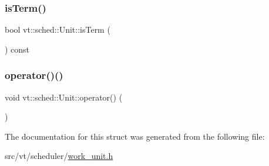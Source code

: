 \mbox{\label{structvt_1_1sched_1_1_unit_a2efa80f96380e04ed664ba2fcd123a61}} 
\subsubsection{\texorpdfstring{is\+Term()}{isTerm()}}
{\footnotesize\ttfamily bool vt\+::sched\+::\+Unit\+::is\+Term (\begin{DoxyParamCaption}{ }\end{DoxyParamCaption}) const\hspace{0.3cm}{\ttfamily [inline]}}

\mbox{\label{structvt_1_1sched_1_1_unit_a27a4a3910deb80e18bfedc9720efa9f6}} 
\subsubsection{\texorpdfstring{operator()()}{operator()()}}
{\footnotesize\ttfamily void vt\+::sched\+::\+Unit\+::operator() (\begin{DoxyParamCaption}{ }\end{DoxyParamCaption})\hspace{0.3cm}{\ttfamily [inline]}}



The documentation for this struct was generated from the following file\+:\begin{DoxyCompactItemize}
\item 
src/vt/scheduler/\hyperlink{work__unit_8h}{work\+\_\+unit.\+h}\end{DoxyCompactItemize}
